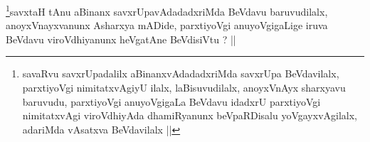 \begin{artha}
\footnote[2]{savaRvu savxrUpadalilx aBinanxvAdadadxriMda savxrUpa
  BeVdavilalx, parxtiyoVgi nimitatxvAgiyU ilalx, laBisuvudilalx,
  anoyxVnAyx sharxyavu baruvudu, parxtiyoVgi anuyoVgigaLa BeVdavu
  idadxrU parxtiyoVgi nimitatxvAgi viroVdhiyAda dhamiRyanunx
  beVpaRDisalu yoVgayxvAgilalx, adariMda vAsatxva BeVdavilalx ||}savxtaH tAnu aBinanx savxrUpavAdadadxriMda BeVdavu baruvudilalx,
anoyxVnayxvanunx Asharxya mADide, parxtiyoVgi anuyoVgigaLige iruva
BeVdavu viroVdhiyanunx heVgatAne BeVdisiVtu ? ||
\end{artha}

\begin{artha}

\end{artha}

\begin{artha}

\end{artha}

\begin{artha}

\end{artha}

\begin{artha}

\end{artha}

\begin{artha}

\end{artha}

\begin{artha}

\end{artha}

\begin{artha}

\end{artha}

\begin{artha}

\end{artha}

\begin{artha}

\end{artha}

\begin{artha}

\end{artha}

